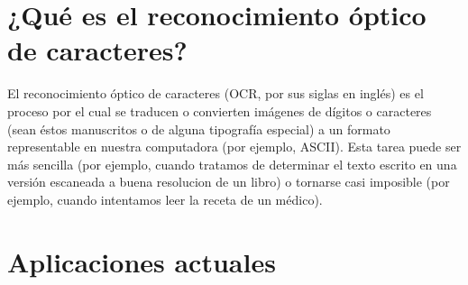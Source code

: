 \documentclass[10pt, a4paper]{article}
\author{Organización del Computador II, DC, UBA.}
\date{}
\title{}
\begin{document}
	
\thispagestyle{empty}

\maketitle

\tableofcontents
\newpage

\section{¿Qué es el reconocimiento óptico de caracteres?}
El reconocimiento óptico de caracteres (OCR, por sus siglas en inglés) es el proceso por el cual se traducen o convierten imágenes de dígitos o caracteres (sean éstos manuscritos o de alguna tipografía especial) a un formato representable en nuestra computadora (por ejemplo, ASCII). Esta tarea puede ser más sencilla (por ejemplo, cuando tratamos de determinar el texto escrito en una versión escaneada a buena resolucion de un libro) o tornarse casi imposible (por ejemplo, cuando intentamos leer la receta de un médico).

\section{Aplicaciones actuales}
\end{document}
